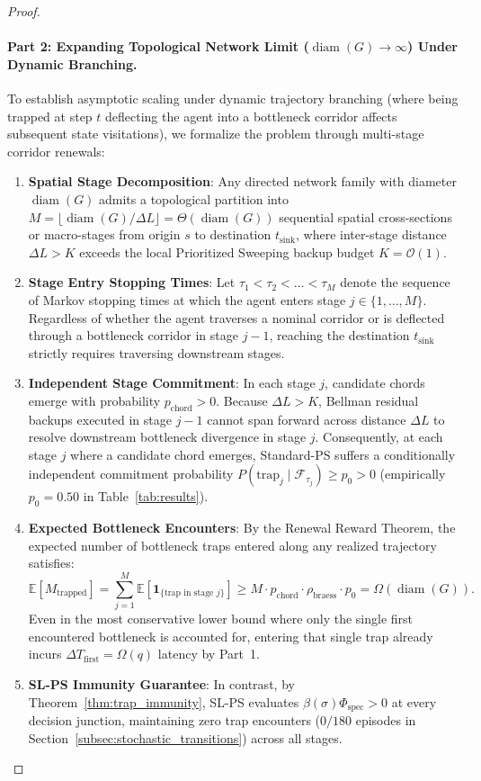 \documentclass[11pt,a4paper]{article}
\begin{document}
\begin{proof}
\paragraph{Part 2: Expanding Topological Network Limit ($\operatorname{diam}(G) \to \infty$) Under Dynamic Branching.}
To establish asymptotic scaling under dynamic trajectory branching (where being trapped at step $t$ deflecting the agent into a bottleneck corridor affects subsequent state visitations), we formalize the problem through multi-stage corridor renewals:
\begin{enumerate}
    \item \textbf{Spatial Stage Decomposition}: Any directed network family with diameter $\operatorname{diam}(G)$ admits a topological partition into $M = \lfloor \operatorname{diam}(G) / \Delta L \rfloor = \Theta(\operatorname{diam}(G))$ sequential spatial cross-sections or macro-stages from origin $s$ to destination $t_{\text{sink}}$, where inter-stage distance $\Delta L > K$ exceeds the local Prioritized Sweeping backup budget $K = \mathcal{O}(1)$.
    \item \textbf{Stage Entry Stopping Times}: Let $\tau_1 < \tau_2 < \dots < \tau_M$ denote the sequence of Markov stopping times at which the agent enters stage $j \in \{1, \dots, M\}$. Regardless of whether the agent traverses a nominal corridor or is deflected through a bottleneck corridor in stage $j-1$, reaching the destination $t_{\text{sink}}$ strictly requires traversing downstream stages.
    \item \textbf{Independent Stage Commitment}: In each stage $j$, candidate chords emerge with probability $p_{\text{chord}} > 0$. Because $\Delta L > K$, Bellman residual backups executed in stage $j-1$ cannot span forward across distance $\Delta L$ to resolve downstream bottleneck divergence in stage $j$. Consequently, at each stage $j$ where a candidate chord emerges, Standard-PS suffers a conditionally independent commitment probability $P(\text{trap}_j \mid \mathcal{F}_{\tau_j}) \ge p_0 > 0$ (empirically $p_0 = 0.50$ in Table~\ref{tab:results}).
    \item \textbf{Expected Bottleneck Encounters}: By the Renewal Reward Theorem, the expected number of bottleneck traps entered along any realized trajectory satisfies:
    \begin{equation}
    \mathbb{E}[M_{\text{trapped}}] = \sum_{j=1}^M \mathbb{E}\left[ \mathbf{1}_{\{ \text{trap in stage } j \}} \right] \ge M \cdot p_{\text{chord}} \cdot \rho_{\text{braess}} \cdot p_0 = \Omega(\operatorname{diam}(G)).
    \end{equation}
    Even in the most conservative lower bound where only the single first encountered bottleneck is accounted for, entering that single trap already incurs $\Delta T_{\text{first}} = \Omega(q)$ latency by Part~1.
    \item \textbf{SL-PS Immunity Guarantee}: In contrast, by Theorem~\ref{thm:trap_immunity}, SL-PS evaluates $\beta(\sigma) \Phi_{\text{spec}} > 0$ at every decision junction, maintaining zero trap encounters ($0/180$ episodes in Section~\ref{subsec:stochastic_transitions}) across all stages.
\end{enumerate}


\end{proof}
\end{document}
